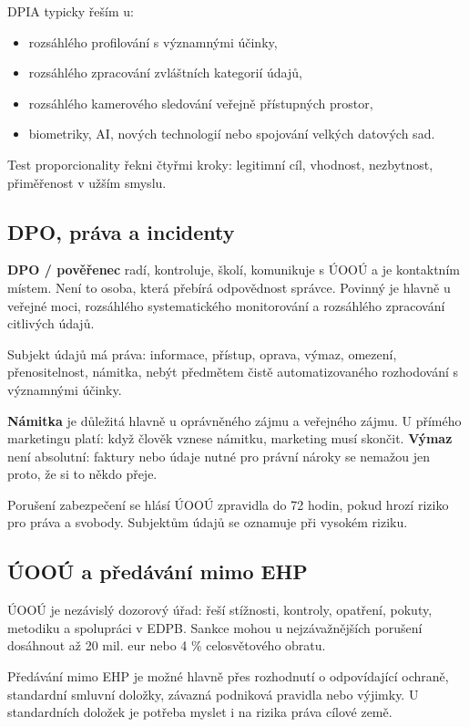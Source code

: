 \documentclass[11pt,a4paper]{article}
\begin{document}
DPIA typicky řeším u:
\begin{itemize}
  \item rozsáhlého profilování s významnými účinky,
  \item rozsáhlého zpracování zvláštních kategorií údajů,
  \item rozsáhlého kamerového sledování veřejně přístupných prostor,
  \item biometriky, AI, nových technologií nebo spojování velkých datových sad.
\end{itemize}

Test proporcionality řekni čtyřmi kroky: legitimní cíl, vhodnost, nezbytnost, přiměřenost v užším smyslu.

\subsection*{DPO, práva a incidenty}
\textbf{DPO / pověřenec} radí, kontroluje, školí, komunikuje s ÚOOÚ a je kontaktním místem. Není to osoba, která přebírá odpovědnost správce. Povinný je hlavně u veřejné moci, rozsáhlého systematického monitorování a rozsáhlého zpracování citlivých údajů.

Subjekt údajů má práva: informace, přístup, oprava, výmaz, omezení, přenositelnost, námitka, nebýt předmětem čistě automatizovaného rozhodování s významnými účinky.

\textbf{Námitka} je důležitá hlavně u oprávněného zájmu a veřejného zájmu. U přímého marketingu platí: když člověk vznese námitku, marketing musí skončit. \textbf{Výmaz} není absolutní: faktury nebo údaje nutné pro právní nároky se nemažou jen proto, že si to někdo přeje.

Porušení zabezpečení se hlásí ÚOOÚ zpravidla do 72 hodin, pokud hrozí riziko pro práva a svobody. Subjektům údajů se oznamuje při vysokém riziku.

\subsection*{ÚOOÚ a předávání mimo EHP}
ÚOOÚ je nezávislý dozorový úřad: řeší stížnosti, kontroly, opatření, pokuty, metodiku a spolupráci v EDPB. Sankce mohou u nejzávažnějších porušení dosáhnout až 20 mil. eur nebo 4 \% celosvětového obratu.

Předávání mimo EHP je možné hlavně přes rozhodnutí o odpovídající ochraně, standardní smluvní doložky, závazná podniková pravidla nebo výjimky. U standardních doložek je potřeba myslet i na rizika práva cílové země.
\end{document}
